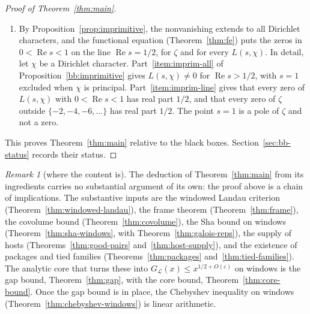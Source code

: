 \documentclass[11pt]{amsbook}
\theoremstyle{plain}
\theoremstyle{definition}
\theoremstyle{remark}
\newtheorem{remark}[theorem]{Remark}
\numberwithin{equation}{section}
\numberwithin{figure}{chapter}
\numberwithin{table}{chapter}
\newcommand{\eps}{\varepsilon}
\newcommand{\lev}{\mathscr{L}}
\begin{document}
\begin{proof}[Proof of Theorem~\ref{thm:main}]
\begin{enumerate}[label=(\arabic*)]
\item\label{item:main-s6}
By Proposition~\ref{prop:imprimitive}, the nonvanishing extends to
all Dirichlet characters, and the functional equation
(Theorem~\ref{thm:fe}) puts the zeros in $0<\operatorname{Re}s<1$ on
the line $\operatorname{Re}s=1/2$, for $\zeta$ and for every
$L(s,\chi)$. In detail, let $\chi$ be a Dirichlet character.
Part~\ref{item:imprim-all} of Proposition~\ref{bb:imprimitive} gives
$L(s,\chi)\ne0$ for $\operatorname{Re}s>1/2$, with $s=1$ excluded
when $\chi$ is principal. Part~\ref{item:imprim-line} gives that
every zero of $L(s,\chi)$ with $0<\operatorname{Re}s<1$ has real
part $1/2$, and that every zero of $\zeta$ outside
$\{-2,-4,-6,\dots\}$ has real part $1/2$. The point $s=1$ is a pole
of $\zeta$ and not a zero.
\end{enumerate}
This proves Theorem~\ref{thm:main} relative to the black boxes.
Section~\ref{sec:bb-status} records their status.
\end{proof}

\begin{remark}[where the content is]\label{rem:content}
The deduction of Theorem~\ref{thm:main} from its ingredients
carries no substantial argument of its own: the proof above is a
chain of implications. The substantive inputs
are the windowed Landau criterion (Theorem~\ref{thm:windowed-landau}),
the frame theorem (Theorem~\ref{thm:frame}), the covolume bound
(Theorem~\ref{thm:covolume}), the Sha bound on windows
(Theorem~\ref{thm:sha-windows}, with Theorem~\ref{thm:galois-reps}),
the supply of hosts (Theorems~\ref{thm:good-pairs}
and~\ref{thm:host-supply}), and the existence of packages and tied
families (Theorems~\ref{thm:packages} and~\ref{thm:tied-families}).
The analytic core that turns these into $G_\lev(x)\le
x^{1/2+O(\eps)}$ on windows is the gap bound,
Theorem~\ref{thm:gap}, with the core bound,
Theorem~\ref{thm:core-bound}. Once the gap bound is in place, the
Chebyshev inequality on windows (Theorem~\ref{thm:chebyshev-windows})
is linear arithmetic.
\end{remark}
\end{document}

